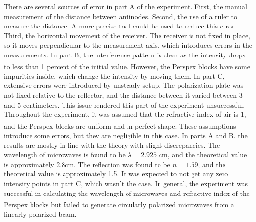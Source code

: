 \documentclass[10pt]{article}
\begin{document}
There are several sources of error in part A of the experiment. First, the manual measurement of the distance between antinodes. Second, the use of a ruler to measure the distance. A more precise tool could be used to reduce this error. Third, the horizontal movement of the receiver. The receiver is not fixed in place, so it moves perpendicular to the measurement axis, which introduces errors in the measurements. In part B, the interference pattern is clear as the intensity drops to less than 1 percent of the initial value. However, the Perspex\textsuperscript{\textregistered} blocks have some impurities inside, which change the intensity by moving them. In part C, extensive errors were introduced by unsteady setup. The polarization plate was not fixed relative to the reflector, and the distance between it varied between 3 and 5 centimeters. This issue rendered this part of the experiment unsuccessful. Throughout the experiment, it was assumed that the refractive index of air is 1, and the Perspex\textsuperscript{\textregistered} blocks are uniform and in perfect shape. These assumptions introduce some errors, but they are negligible in this case. In parts A and B, the results are mostly in line with the theory with slight discrepancies. The wavelength of microwaves is found to be $\lambda = 2.925$ cm, and the theoretical value is approximately 2.8cm. The reflection was found to be $n = 1.59$, and the theoretical value is approximately 1.5. It was expected to not get any zero intensity points in part C, which wasn't the case. In general, the experiment was successful in calculating the wavelength of microwaves and refractive index of the Perspex\textsuperscript{\textregistered} blocks but failed to generate circularly polarized microwaves from a linearly polarized beam.
\end{document}
